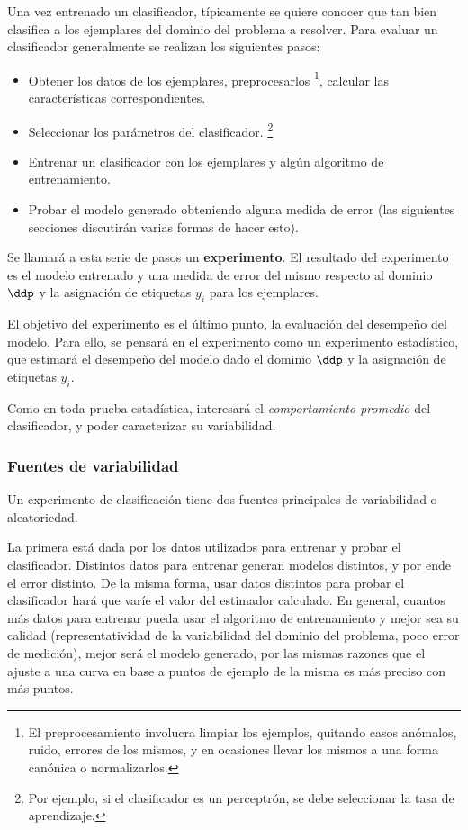 
Una vez entrenado un clasificador, típicamente se quiere conocer que tan bien clasifica a los ejemplares del dominio del problema a resolver. Para evaluar un clasificador generalmente se realizan los siguientes pasos:

\begin{itemize}
	\item Obtener los datos de los ejemplares, preprocesarlos \footnote{El preprocesamiento involucra limpiar los ejemplos, quitando casos anómalos, ruido, errores de los mismos, y en ocasiones llevar los mismos a una forma canónica o normalizarlos.}, calcular las características correspondientes.
  \item Seleccionar los parámetros del clasificador. \footnote{Por ejemplo, si el clasificador es un perceptrón, se debe seleccionar la tasa de aprendizaje.}
  \item Entrenar un clasificador con los ejemplares y algún algoritmo de entrenamiento.
  \item Probar el modelo generado obteniendo alguna medida de error (las siguientes secciones discutirán varias formas de hacer esto).
\end{itemize}

Se llamará a esta serie de pasos un \textbf{experimento}. El resultado del experimento es el modelo entrenado y una medida de error del mismo respecto al dominio $\ddp$ y la asignación de etiquetas $y_i$ para los ejemplares.

El objetivo del experimento es el último punto, la evaluación del desempeño del modelo. Para ello, se pensará en el experimento como un experimento estadístico, que estimará el desempeño del modelo dado el dominio $\ddp$ y la asignación de 
etiquetas $y_i$.

Como en toda prueba estadística, interesará el \textit{comportamiento promedio} del clasificador, y poder caracterizar su variabilidad.

\subsubsection{Fuentes de variabilidad}

Un experimento de clasificación tiene dos fuentes principales de variabilidad o aleatoriedad. 

La primera está dada por los datos utilizados para entrenar y probar el clasificador. Distintos datos para entrenar generan modelos distintos, y por ende el error distinto. De la misma forma, usar datos distintos para probar el clasificador hará que varíe el valor del estimador calculado. En general, cuantos más datos para entrenar pueda usar el algoritmo de entrenamiento y mejor sea su calidad (representatividad de la variabilidad del dominio del problema, poco error de medición), mejor será el modelo generado, por las mismas razones que el ajuste a una curva en base a puntos de ejemplo de la misma es más preciso con más puntos. 

